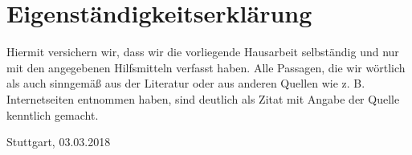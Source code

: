 \section*{Eigenständigkeitserklärung}
\vspace*{2cm}
\begin{center}
	\begin{minipage}[t]{0.8\textwidth}
		Hiermit versichern wir, dass wir die vorliegende Hausarbeit selbständig und nur mit den angegebenen Hilfsmitteln verfasst haben. Alle Passagen, die wir wörtlich als auch sinngemäß aus der Literatur oder aus anderen Quellen wie z. B. Internetseiten entnommen haben, sind deutlich als Zitat mit Angabe der Quelle kenntlich gemacht.
		
		\vspace*{60mm}
		Stuttgart, 03.03.2018
	\end{minipage}
\end{center}




